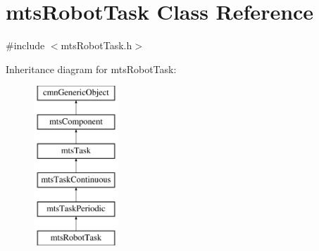 \hypertarget{classmts_robot_task}{\section{mts\-Robot\-Task Class Reference}
\label{classmts_robot_task}
}


{\ttfamily \#include $<$mts\-Robot\-Task.\-h$>$}

Inheritance diagram for mts\-Robot\-Task\-:\begin{figure}[H]
\begin{center}
\leavevmode
\includegraphics[height=6.000000cm]{dd/dd1/classmts_robot_task}
\end{center}
\end{figure}
